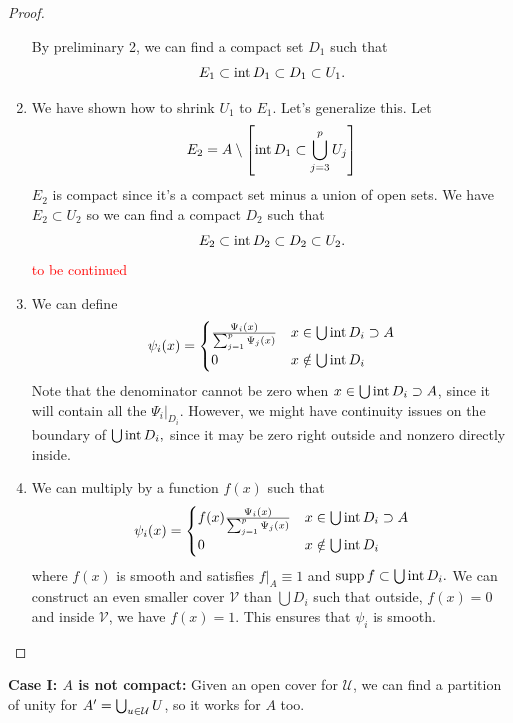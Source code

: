 \documentclass{article}
\numberwithin{equation}{section}
\begin{document}
\begin{proof}
\begin{enumerate}
        By preliminary 2, we can find a compact set $D_1$ such that 
        \begin{equation}
            E_1 \subset \operatorname{int} D_1 \subset D_1 \subset U_1.
        \end{equation}
        \item We have shown how to shrink $U_1$ to $E_1.$ Let's generalize this. Let
        \begin{equation}
            E_2 = A \setminus \left[\operatorname{int} D_1 \subset \bigcup_{j=3}^p U_j\right]
        \end{equation}
        $E_2$ is compact since it's a compact set minus a union of open sets. We have $E_2 \subset U_2$ so we can find a compact $D_2$ such that 
        \begin{equation}
            E_2 \subset \operatorname{int} D_2 \subset D_2 \subset U_2.
        \end{equation}
        \textcolor{red}{to be continued}
        \item We can define 
        \begin{equation}
            \psi_i(x) = \begin{cases}
                \frac{\Psi_i(x)}{\sum_{j=1}^{p} \Psi_j(x)} & x \in \bigcup \operatorname{int} D_i \supset A \\ 
                0 & x \notin \bigcup \operatorname{int} D_i
            \end{cases}
        \end{equation}
        Note that the denominator cannot be zero when $x\in \bigcup \operatorname{int} D_i \supset A$, since it will contain all the $\Psi_i |_{D_i}$. However, we might have continuity issues on the boundary of $\bigcup \operatorname{int} D_i,$ since it may be zero right outside and nonzero directly inside.
        \item We can multiply by a function $f(x)$ such that 
        \begin{equation}
            \psi_i(x) = \begin{cases}
                f(x) \frac{\Psi_i(x)}{\sum_{j=1}^{p} \Psi_j(x)} & x \in \bigcup \operatorname{int} D_i \supset A \\ 
                0 & x \notin \bigcup \operatorname{int} D_i
            \end{cases}
        \end{equation} 
        where $f(x)$ is smooth and satisfies $f|_A \equiv 1$ and $\operatorname{supp} f \subset \bigcup \operatorname{int} D_i.$ We can construct an even smaller cover $\mathcal{V}$ than $\bigcup D_i$ such that outside, $f(x) = 0$ and inside $\mathcal{V}$, we have $f(x)=1.$ This ensures that $\psi_i$ is smooth.
    \end{enumerate}
\end{proof}
\textbf{Case I: $A$ is not compact:}
Given an open cover for $\mathcal{U}$, we can find a partition of unity for $A' = \bigcup_{u\in \cal{U}} U$, so it works for $A$ too.
\end{document}
